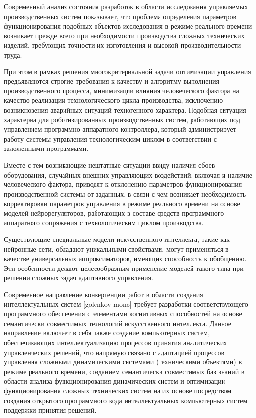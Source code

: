 Современный анализ состояния разработок в области исследования управляемых производственных систем показывает, что проблема определения параметров функционирования подобных объектов исследования в режиме реального времени возникает прежде всего при необходимости производства сложных технических изделий, требующих точности их изготовления и высокой производительности труда.

При этом в рамках решения многокритериальной задачи оптимизации управления предъявляются строгие требования к качеству и алгоритму выполнения производственного процесса, минимизации влияния человеческого фактора на качество реализации технологического цикла производства, исключению возникновения аварийных ситуаций техногенного характера. Подобная ситуация характерна для роботизированных производственных систем, работающих под управлением программно-аппаратного контроллера, который администрирует работу системы управления технологическим циклом в соответствии с заложенными программами.

Вместе с тем возникающие нештатные ситуации ввиду наличия сбоев оборудования, случайных внешних управляющих воздействий, включая и наличие человеческого фактора, приводят к отклонению параметров функционирования производственной системы от заданных, в связи с чем возникает необходимость корректировки параметров управления в режиме реального времени на основе моделей нейрорегуляторов, работающих в составе средств программного-аппаратного сопряжения с технологическим циклом производства.

Существующие специальные модели искусственного интеллекта, такие как нейронные сети, обладают уникальными свойствами, могут применяться в качестве универсальных аппроксиматоров, имеющих способность к обобщению. Эти особенности делают целесообразным применение моделей такого типа при решении сложных задач адаптивного управления.

Современное направление конвергенции работ в области создания интеллектуальных систем [golenkov mono] требует разработки соответствующего программного обеспечения с элементами когнитивных способностей на основе семантически совместимых технологий искусственного интеллекта. Данное направление включает в себя также создание компьютерных систем, обеспечивающих интеллектуализацию процессов принятия аналитических управленческих решений, что напрямую связано с адаптацией процессов управления сложными динамическими системами (техническими объектами) в режиме реального времени, созданием семантически совместимых баз знаний в области анализа функционирования динамических систем и оптимизации функционирования сложных технических систем на их основе посредством создания открытого программного кода интеллектуальных компьютерных систем поддержки принятия решений.



